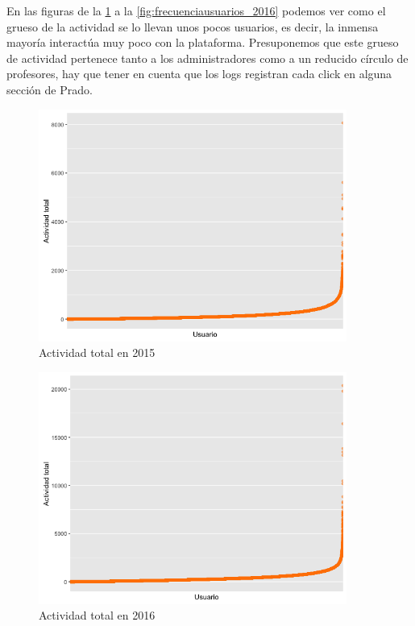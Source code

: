 En las figuras de la \ref{fig:actividadtotal_2015} a la \ref{fig:frecuenciausuarios_2016} podemos ver como el grueso de la actividad se lo llevan unos pocos usuarios, es decir, la inmensa mayoría interactúa muy poco con la plataforma. Presuponemos que este grueso de actividad pertenece tanto a los administradores como a un reducido círculo de profesores, hay que tener en cuenta que los logs registran cada click en alguna sección de Prado.

\begin{figure}[H]
\centering
\includegraphics[width=0.9\textwidth]{../r/actividadtotal_2015}
\caption{Actividad total en 2015}
\label{fig:actividadtotal_2015}
\end{figure}

\begin{figure}[H]
\centering
\includegraphics[width=0.9\textwidth]{../r/actividadtotal_2016}
\caption{Actividad total en 2016}
\label{fig:actividadtotal_2016}
\end{figure}

